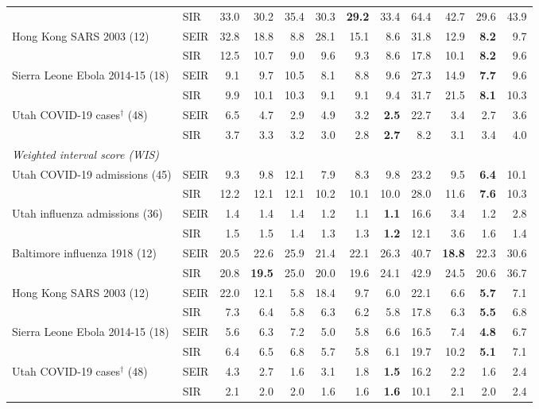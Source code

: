 \begin{tabular}{llrrrrrrrrrr}
 & SIR & 33.0 & 30.2 & 35.4 & 30.3 & \textbf{29.2} & 33.4 & 64.4 & 42.7 & 29.6 & 43.9 \\
Hong Kong SARS 2003 (12) & SEIR & 32.8 & 18.8 & 8.8 & 28.1 & 15.1 & 8.6 & 31.8 & 12.9 & \textbf{8.2} & 9.7 \\
 & SIR & 12.5 & 10.7 & 9.0 & 9.6 & 9.3 & 8.6 & 17.8 & 10.1 & \textbf{8.2} & 9.6 \\
Sierra Leone Ebola 2014-15 (18) & SEIR & 9.1 & 9.7 & 10.5 & 8.1 & 8.8 & 9.6 & 27.3 & 14.9 & \textbf{7.7} & 9.6 \\
 & SIR & 9.9 & 10.1 & 10.3 & 9.1 & 9.1 & 9.4 & 31.7 & 21.5 & \textbf{8.1} & 10.3 \\
Utah COVID-19 cases$^\dagger$ (48) & SEIR & 6.5 & 4.7 & 2.9 & 4.9 & 3.2 & \textbf{2.5} & 22.7 & 3.4 & 2.7 & 3.6 \\
 & SIR & 3.7 & 3.3 & 3.2 & 3.0 & 2.8 & \textbf{2.7} & 8.2 & 3.1 & 3.4 & 4.0 \\
\midrule
\multicolumn{12}{l}{\textit{Weighted interval score (WIS)}} \\
Utah COVID-19 admissions (45) & SEIR & 9.3 & 9.8 & 12.1 & 7.9 & 8.3 & 9.8 & 23.2 & 9.5 & \textbf{6.4} & 10.1 \\
 & SIR & 12.2 & 12.1 & 12.1 & 10.2 & 10.1 & 10.0 & 28.0 & 11.6 & \textbf{7.6} & 10.3 \\
Utah influenza admissions (36) & SEIR & 1.4 & 1.4 & 1.4 & 1.2 & 1.1 & \textbf{1.1} & 16.6 & 3.4 & 1.2 & 2.8 \\
 & SIR & 1.5 & 1.5 & 1.4 & 1.3 & 1.3 & \textbf{1.2} & 12.1 & 3.6 & 1.6 & 1.4 \\
Baltimore influenza 1918 (12) & SEIR & 20.5 & 22.6 & 25.9 & 21.4 & 22.1 & 26.3 & 40.7 & \textbf{18.8} & 22.3 & 30.6 \\
 & SIR & 20.8 & \textbf{19.5} & 25.0 & 20.0 & 19.6 & 24.1 & 42.9 & 24.5 & 20.6 & 36.7 \\
Hong Kong SARS 2003 (12) & SEIR & 22.0 & 12.1 & 5.8 & 18.4 & 9.7 & 6.0 & 22.1 & 6.6 & \textbf{5.7} & 7.1 \\
 & SIR & 7.3 & 6.4 & 5.8 & 6.3 & 6.2 & 5.8 & 17.8 & 6.3 & \textbf{5.5} & 6.8 \\
Sierra Leone Ebola 2014-15 (18) & SEIR & 5.6 & 6.3 & 7.2 & 5.0 & 5.8 & 6.6 & 16.5 & 7.4 & \textbf{4.8} & 6.7 \\
 & SIR & 6.4 & 6.5 & 6.8 & 5.7 & 5.8 & 6.1 & 19.7 & 10.2 & \textbf{5.1} & 7.1 \\
Utah COVID-19 cases$^\dagger$ (48) & SEIR & 4.3 & 2.7 & 1.6 & 3.1 & 1.8 & \textbf{1.5} & 16.2 & 2.2 & 1.6 & 2.4 \\
 & SIR & 2.1 & 2.0 & 2.0 & 1.6 & 1.6 & \textbf{1.6} & 10.1 & 2.1 & 2.0 & 2.4 \\
\bottomrule
\end{tabular}
